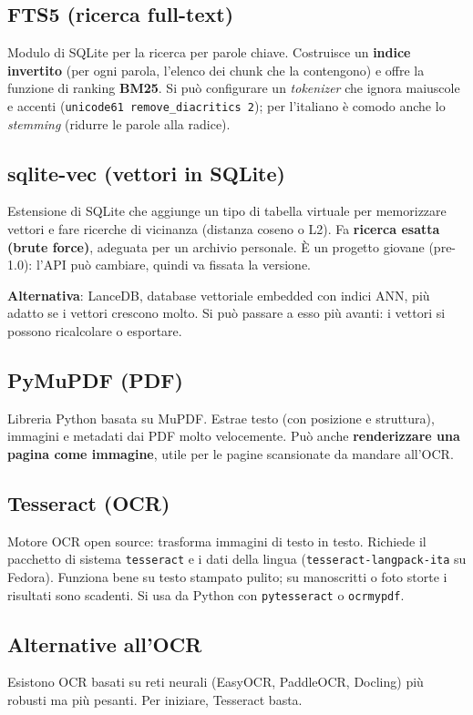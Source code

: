 \documentclass[11pt,a4paper]{article}
\newcommand{\code}[1]{\texttt{\small #1}}
\begin{document}
\subsection{FTS5 (ricerca full-text)}
Modulo di SQLite per la ricerca per parole chiave. Costruisce un \textbf{indice invertito} (per ogni parola, l'elenco dei chunk che la contengono) e offre la funzione di ranking \textbf{BM25}. Si può configurare un \emph{tokenizer} che ignora maiuscole e accenti (\code{unicode61 remove\_diacritics 2}); per l'italiano è comodo anche lo \emph{stemming} (ridurre le parole alla radice).

\subsection{sqlite-vec (vettori in SQLite)}
Estensione di SQLite che aggiunge un tipo di tabella virtuale per memorizzare vettori e fare ricerche di vicinanza (distanza coseno o L2). Fa \textbf{ricerca esatta (brute force)}, adeguata per un archivio personale. È un progetto giovane (pre-1.0): l'API può cambiare, quindi va fissata la versione.

\textbf{Alternativa}: LanceDB, database vettoriale embedded con indici ANN, più adatto se i vettori crescono molto. Si può passare a esso più avanti: i vettori si possono ricalcolare o esportare.

\subsection{PyMuPDF (PDF)}
Libreria Python basata su MuPDF. Estrae testo (con posizione e struttura), immagini e metadati dai PDF molto velocemente. Può anche \textbf{renderizzare una pagina come immagine}, utile per le pagine scansionate da mandare all'OCR.

\subsection{Tesseract (OCR)}
Motore OCR open source: trasforma immagini di testo in testo. Richiede il pacchetto di sistema \code{tesseract} e i dati della lingua (\code{tesseract-langpack-ita} su Fedora). Funziona bene su testo stampato pulito; su manoscritti o foto storte i risultati sono scadenti. Si usa da Python con \code{pytesseract} o \code{ocrmypdf}.

\subsection{Alternative all'OCR}
Esistono OCR basati su reti neurali (EasyOCR, PaddleOCR, Docling) più robusti ma più pesanti. Per iniziare, Tesseract basta.
\end{document}
